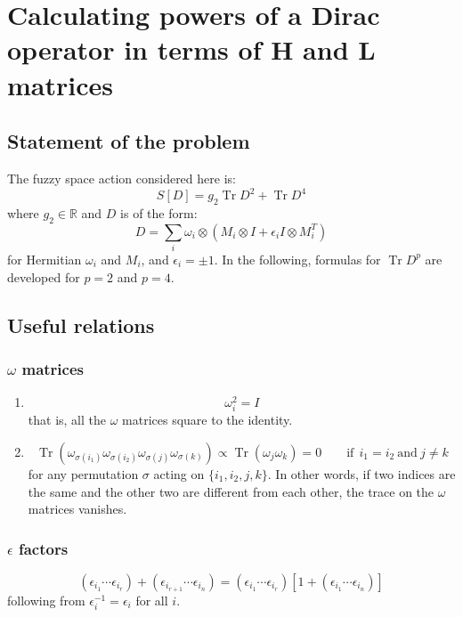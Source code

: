 \documentclass[12pt,a4paper]{article}
\DeclareMathOperator{\Tr}{Tr}
\begin{document}
\section{Calculating powers of a Dirac operator in terms of H and L matrices}
\subsection{Statement of the problem}
The fuzzy space action considered here is:
\begin{equation}
S[D] = g_2 \Tr D^2 + \Tr D^4
\end{equation} 
where $g_2 \in \mathbb{R}$ and $D$ is of the form:
\begin{equation}
D = \sum_i \omega_i \otimes (M_i \otimes I + \epsilon_i I \otimes M_i^T)
\end{equation}
for Hermitian $\omega_i$ and $M_i$, and $\epsilon_i = \pm 1$. \newline
In the following, formulas for $\Tr D^p$ are developed for $p=2$ and $p=4$.
\subsection{Useful relations}
\subsubsection{$\omega$ matrices}
\begin{enumerate}
\item
\begin{equation}
\omega_i^2 = I
\end{equation}
that is, all the $\omega$ matrices square to the identity.
\item 
\begin{equation}\label{eq:vanomega}
\Tr(\omega_{\sigma(i_1)} \omega_{\sigma(i_2)} \omega_{\sigma(j)} \omega_{\sigma(k)}) \propto \Tr(\omega_j \omega_k) = 0 \qquad \text{if} \ \ i_1 = i_2 \ \text{and} \ j \neq k
\end{equation}
for any permutation $\sigma$ acting on $\{i_1, i_2, j, k\}$. In other words, if two indices are the same and the other two are different from each other, the trace on the $\omega$ matrices vanishes.
\end{enumerate}
\subsubsection{$\epsilon$ factors}
\begin{equation}\label{eq:eps}
(\epsilon_{i_1} \cdots \epsilon_{i_r}) + (\epsilon_{i_{r+1}} \cdots \epsilon_{i_n}) = (\epsilon_{i_1} \cdots \epsilon_{i_r}) [1 + (\epsilon_{i_1} \cdots \epsilon_{i_n})]
\end{equation}
following from $\epsilon_i^{-1} = \epsilon_i$ for all $i$.
\end{document}
